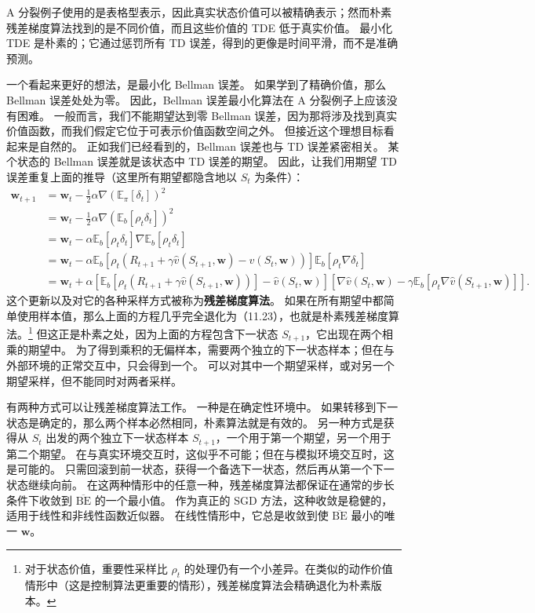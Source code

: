 \documentclass[UTF8, 12pt, fontset=fandol, oneside]{ctexart}
\begin{document}
A 分裂例子使用的是表格型表示，因此真实状态价值可以被精确表示；然而朴素残差梯度算法找到的是不同价值，而且这些价值的 TDE 低于真实价值。
最小化 TDE 是朴素的；它通过惩罚所有 TD 误差，得到的更像是时间平滑，而不是准确预测。

一个看起来更好的想法，是最小化 Bellman 误差。
如果学到了精确价值，那么 Bellman 误差处处为零。
因此，Bellman 误差最小化算法在 A 分裂例子上应该没有困难。
一般而言，我们不能期望达到零 Bellman 误差，因为那将涉及找到真实价值函数，而我们假定它位于可表示价值函数空间之外。
但接近这个理想目标看起来是自然的。
正如我们已经看到的，Bellman 误差也与 TD 误差紧密相关。
某个状态的 Bellman 误差就是该状态中 TD 误差的期望。
因此，让我们用期望 TD 误差重复上面的推导（这里所有期望都隐含地以 $S_t$ 为条件）：
\[
\begin{aligned}
\mathbf{w}_{t+1}
&=\mathbf{w}_t-\frac{1}{2}\alpha\nabla\left(\mathbb{E}_\pi[\delta_t]\right)^2\\
&=\mathbf{w}_t-\frac{1}{2}\alpha\nabla\left(\mathbb{E}_b[\rho_t\delta_t]\right)^2\\
&=\mathbf{w}_t-\alpha\mathbb{E}_b[\rho_t\delta_t]\nabla\mathbb{E}_b[\rho_t\delta_t]\\
&=\mathbf{w}_t-\alpha\mathbb{E}_b[\rho_t(R_{t+1}+\gamma\hat v(S_{t+1},\mathbf{w})-\hat v(S_t,\mathbf{w}))]\mathbb{E}_b[\rho_t\nabla\delta_t]\\
&=\mathbf{w}_t+\alpha\left[\mathbb{E}_b[\rho_t(R_{t+1}+\gamma\hat v(S_{t+1},\mathbf{w}))]-\hat v(S_t,\mathbf{w})\right]
\left[\nabla\hat v(S_t,\mathbf{w})-\gamma\mathbb{E}_b[\rho_t\nabla\hat v(S_{t+1},\mathbf{w})]\right].
\end{aligned}
\]
这个更新以及对它的各种采样方式被称为\textbf{残差梯度算法}。
如果在所有期望中都简单使用样本值，那么上面的方程几乎完全退化为（11.23），也就是朴素残差梯度算法。\footnote{对于状态价值，重要性采样比 $\rho_t$ 的处理仍有一个小差异。在类似的动作价值情形中（这是控制算法更重要的情形），残差梯度算法会精确退化为朴素版本。}
但这正是朴素之处，因为上面的方程包含下一状态 $S_{t+1}$，它出现在两个相乘的期望中。
为了得到乘积的无偏样本，需要两个独立的下一状态样本；但在与外部环境的正常交互中，只会得到一个。
可以对其中一个期望采样，或对另一个期望采样，但不能同时对两者采样。

有两种方式可以让残差梯度算法工作。
一种是在确定性环境中。
如果转移到下一状态是确定的，那么两个样本必然相同，朴素算法就是有效的。
另一种方式是获得从 $S_t$ 出发的两个独立下一状态样本 $S_{t+1}$，一个用于第一个期望，另一个用于第二个期望。
在与真实环境交互时，这似乎不可能；但在与模拟环境交互时，这是可能的。
只需回滚到前一状态，获得一个备选下一状态，然后再从第一个下一状态继续向前。
在这两种情形中的任意一种，残差梯度算法都保证在通常的步长条件下收敛到 $\overline{\mathrm{BE}}$ 的一个最小值。
作为真正的 SGD 方法，这种收敛是稳健的，适用于线性和非线性函数近似器。
在线性情形中，它总是收敛到使 $\overline{\mathrm{BE}}$ 最小的唯一 $\mathbf{w}$。
\end{document}
